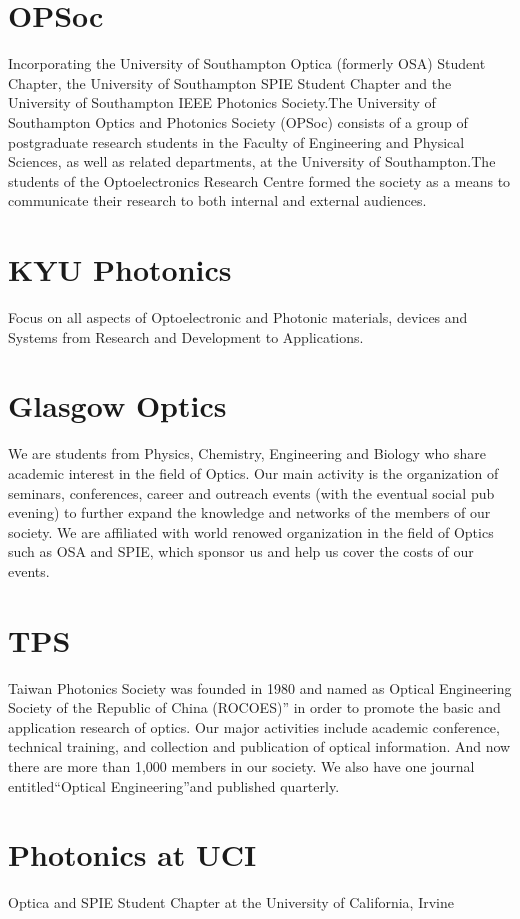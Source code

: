 \documentclass[12pt, a4paper, twocolumn]{article}
\begin{document}
    \section{OPSoc}
    Incorporating the University of Southampton Optica (formerly OSA) Student Chapter, the University of Southampton SPIE Student Chapter and the University of Southampton IEEE Photonics Society.The University of Southampton Optics and Photonics Society (OPSoc) consists of a group of postgraduate research students in the Faculty of Engineering and Physical Sciences, as well as related departments, at the University of Southampton.The students of the Optoelectronics Research Centre formed the society as a means to communicate their research to both internal and external audiences.

    \section{KYU Photonics}
    Focus on all aspects of Optoelectronic and Photonic materials, devices and Systems from Research and Development to Applications.

    \section{Glasgow Optics}
    We are students from Physics, Chemistry, Engineering and Biology who share academic interest in the field of Optics. Our main activity is the organization of seminars, conferences, career and outreach events (with the eventual social pub evening) to further expand the knowledge and networks of the members of our society. We are affiliated with world renowed organization in the field of Optics such as OSA and SPIE, which sponsor us and help us cover the costs of our events.

    \section{TPS}
    Taiwan Photonics Society was founded in 1980 and named as Optical Engineering Society of the Republic of China (ROCOES)” in order to promote the basic and application research of optics. Our major activities include academic conference, technical training, and collection and publication of optical information. And now there are more than 1,000 members in our society. We also have one journal entitled“Optical Engineering”and published quarterly.

    \section{Photonics at UCI}
    Optica and SPIE Student Chapter at the University of California, Irvine
\end{document}
